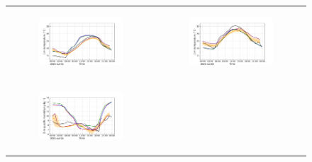 \begin{figure}[hbtp]
    \centering
    \begin{tabular}{cc}
        \begin{subfigure}[t]{0.5\textwidth}
            \caption{}
            \includegraphics[width=\textwidth]{images/chap5/IOP_TS/TS_2021-07-15_elsplans_t2m.png}
        \end{subfigure} &
        \begin{subfigure}[t]{0.5\textwidth}
            \caption{}
            \includegraphics[width=\textwidth]{images/chap5/IOP_TS/TS_2021-07-20_elsplans_t2m.png}
        \end{subfigure} \\
        \begin{subfigure}[t]{0.5\textwidth}
            \caption{}
            \includegraphics[width=\textwidth]{images/chap5/IOP_TS/TS_2021-07-15_elsplans_q2m.png}

\end{subfigure}
\end{tabular}
\end{figure}
